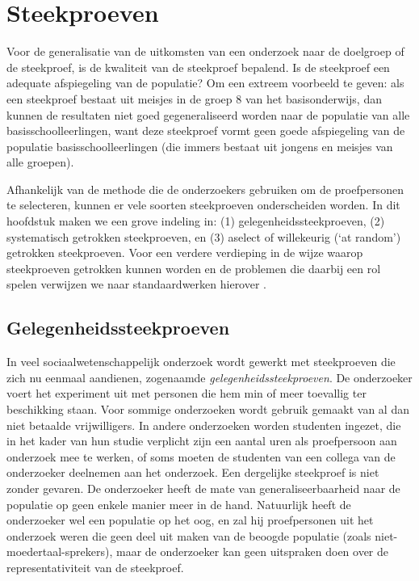 \documentclass[
]{book}
\begin{document}
\chapter{Steekproeven}\label{ch-steekproeftrekking}

Voor de generalisatie van de uitkomsten van een onderzoek naar de
doelgroep of de steekproef, is de kwaliteit van de steekproef bepalend.
Is de steekproef een adequate afspiegeling van de populatie? Om een
extreem voorbeeld te geven: als een steekproef bestaat uit meisjes in de
groep 8 van het basisonderwijs, dan kunnen de resultaten niet goed
gegeneraliseerd worden naar de populatie van alle basisschoolleerlingen,
want deze steekproef vormt geen goede afspiegeling van de populatie
basisschoolleerlingen (die immers bestaat uit jongens en meisjes van
alle groepen).

Afhankelijk van de methode die de onderzoekers gebruiken om de
proefpersonen te selecteren, kunnen er vele soorten steekproeven
onderscheiden worden. In dit hoofdstuk maken we een grove indeling in:
(1) gelegenheidssteekproeven, (2) systematisch getrokken steekproeven,
en (3) aselect of willekeurig (`at random') getrokken steekproeven. Voor
een verdere verdieping in de wijze waarop steekproeven getrokken kunnen
worden en de problemen die daarbij een rol spelen verwijzen we naar
standaardwerken hierover \citep{Coch77, Thom12}.

\section{Gelegenheidssteekproeven}\label{sec:gelegenheidssteekproef}

In veel sociaalwetenschappelijk onderzoek wordt gewerkt met steekproeven
die zich nu eenmaal aandienen, zogenaamde \emph{gelegenheidssteekproeven}. De
onderzoeker voert het experiment uit met personen die hem min of meer
toevallig ter beschikking staan. Voor sommige onderzoeken wordt gebruik
gemaakt van al dan niet betaalde vrijwilligers. In andere onderzoeken
worden studenten ingezet, die in het kader van hun studie verplicht zijn
een aantal uren als proefpersoon aan onderzoek mee te werken, of soms
moeten de studenten van een collega van de onderzoeker deelnemen aan het
onderzoek. Een dergelijke steekproef is niet zonder gevaren. De
onderzoeker heeft de mate van generaliseerbaarheid naar de populatie op
geen enkele manier meer in de hand. Natuurlijk heeft de onderzoeker wel
een populatie op het oog, en zal hij proefpersonen uit het onderzoek
weren die geen deel uit maken van de beoogde populatie (zoals
niet-moedertaal-sprekers), maar de onderzoeker kan geen uitspraken doen
over de representativiteit van de steekproef.
\end{document}

